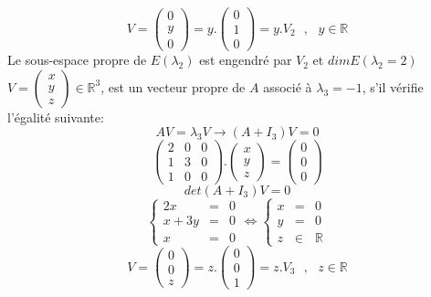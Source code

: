 \documentclass[a4paper,12pt,french]{article}
\begin{document}
\[V=\begin{pmatrix}
	0  \\
	y  \\
	0
	
\end{pmatrix}=y.\begin{pmatrix}
	0  \\
	1  \\
	0
	
\end{pmatrix}=y.V_{2}~~~,~~~ y \in \mathbb{R}\]
Le sous-espace propre de $E(\lambda_{2})$ est engendré par $V_{2} $ et $dim E(\lambda_{2}=2)$\\
$V=\begin{pmatrix}
	x  \\
	y  \\
	z
	
\end{pmatrix} \in \mathbb{R}^{3}$, est un vecteur propre de $A$ associé à $\lambda_{3}=-1$, s'il vérifie l'égalité suivante:\\
\[AV=\lambda_{3}V \rightarrow (A+I_{3})V=0\]
\[\begin{pmatrix}
	2 & 0 & 0  \\
	1 & 3 & 0 \\
	1 & 0 & 0
	
\end{pmatrix}.\begin{pmatrix}
	x   \\
	y   \\
	z 
	
\end{pmatrix}=\begin{pmatrix}
	0   \\
	0  \\
	0 
	
\end{pmatrix}\] 
\[det(A+I_{3})V=0\]
\[\left \{
\begin{array}{rcl}
	2x&=&0 \\
	x+3y&=&0\\
	x&=&0
\end{array}
\right. \Leftrightarrow \left \{
\begin{array}{rcl}
	x&=&0 \\
	y&=&0\\
	z&\in& \mathbb{R}
\end{array}
\right. \]
\[V=\begin{pmatrix}
	0  \\
	0  \\
	z
	
\end{pmatrix}=z.\begin{pmatrix}
	0  \\
	0  \\
	1
	
\end{pmatrix}=z.V_{3}~~~,~~~ z \in \mathbb{R}\]
\end{document}
